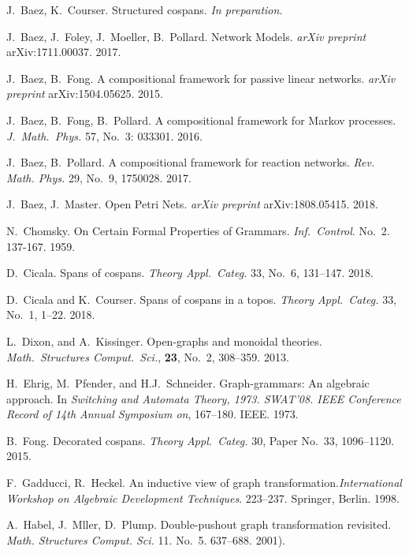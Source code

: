 \documentclass{amsart}
\theoremstyle{remark}
\theoremstyle{definition}
\begin{document}
\begin{thebibliography}{99}

 J.~Baez, K.~Courser. Structured cospans. \emph{In preparation}.

 J.~Baez, J.~Foley, J.~Moeller, B.~Pollard. Network
  Models. \emph{arXiv preprint} arXiv:1711.00037. 2017.
  
 J.~Baez, B.~Fong. A compositional framework for passive linear networks. \emph{arXiv preprint} arXiv:1504.05625. 2015.

 J.~Baez, B.~Fong, B.~Pollard. A compositional
  framework for Markov processes. \emph{J.~Math.~Phys.} 57, No.~3:
  033301. 2016.
  
 J.~Baez, B.~Pollard. A compositional framework for
  reaction networks. \emph{Rev. Math. Phys.} 29, No.~9, 1750028. 2017.

 J.~Baez, J.~Master. Open Petri Nets. \emph{arXiv preprint} arXiv:1808.05415. 2018.
  
 N.~Chomsky. On Certain Formal Properties of Grammars.
\emph{Inf.~Control}. No.~2. 137-167. 1959. 
  
 D.\ Cicala. Spans of cospans. \emph{Theory Appl.\
    Categ.} 33, No.\ 6, 131--147. 2018.

 D.\ Cicala and K.\ Courser. Spans of
  cospans in a topos. \emph{Theory Appl.\ Categ.} 33, No.\ 1,
  1--22. 2018.

 L.\ Dixon, and A.\ Kissinger. Open-graphs
  and monoidal theories. \emph{Math.\ Structures Comput.\ Sci.},
  \textbf{23}, No.\ 2, 308--359. 2013.

 H.\ Ehrig, M.\ Pfender, and H.J.\
  Schneider. Graph-grammars: An algebraic approach. In \emph{Switching
    and Automata Theory, 1973. SWAT'08. IEEE Conference Record of 14th
    Annual Symposium on}, 167--180. IEEE. 1973.
  
 B.\ Fong. Decorated cospans. \emph{Theory
    Appl.\ Categ.} 30, Paper No.\ 33, 1096--1120. 2015.
          
\bibitem{Gadd_IndGraphTrans} F.\ Gadducci, R.\ Heckel. An inductive
  view of graph transformation.\emph{International Workshop on
    Algebraic Development Techniques}. 223--237. Springer, Berlin. 1998.

\bibitem{DblPushoutRevis} A.~Habel, J.~M\:{u}ller,
  D.~Plump. Double-pushout graph transformation
  revisited. \emph{Math. Structures Comput. Sci.}
  11. No.~5. 637--688. 2001).
  

\end{thebibliography}
\end{document}
